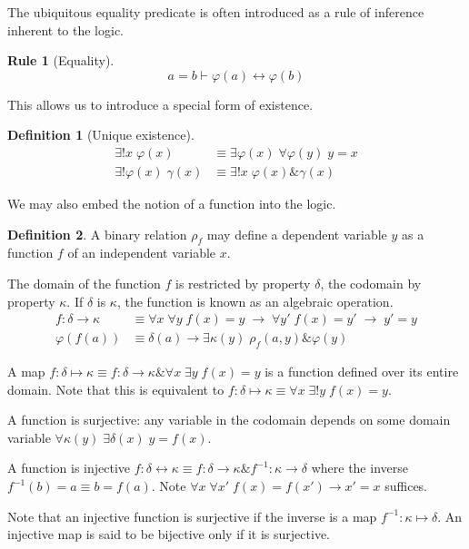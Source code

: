\documentclass{amsbook}
\newcommand{\infers}{\mathrel\vdash}
\newcommand{\univ}[1]{\mathord\forall#1\;}
\newcommand{\exis}[1]{\mathord\exists#1\;}
\newcommand{\then}{\mathrel\rightarrow}
\newcommand{\conj}{\mathrel\&}
\newcommand{\eqv}{\mathrel\leftrightarrow}
\theoremstyle{definition}
\newtheorem{frule}{Rule}[chapter]
\newtheorem{dfn}{Definition}[section]
\begin{document}
The ubiquitous equality predicate is often introduced as a rule of inference inherent to the logic.

\begin{frule}[Equality]
    $$a = b \infers \varphi(a) \eqv \varphi(b)$$
\end{frule}

This allows us to introduce a special form of existence.

\begin{dfn}[Unique existence]
    $$\begin{aligned}
            \exis{!x} \varphi(x)         & \equiv \exis{\varphi(x)} \univ{\varphi(y)} y = x \\
            \exis{!\varphi(x)} \gamma(x) & \equiv \exis{!x} \varphi(x) \conj \gamma(x)
        \end{aligned}$$
\end{dfn}

We may also embed the notion of a function into the logic.

\begin{dfn}
    A binary relation $\rho_f$ may define a dependent variable $y$ as a function $f$ of an independent variable $x$.

    The domain of the function $f$ is restricted by property $\delta$, the codomain by property $\kappa$.
    If $\delta$ is $\kappa$, the function is known as an algebraic operation.
    $$\begin{aligned}
            f: \delta \longrightarrow \kappa & \equiv \univ x \univ y f(x) = y\; \then \;\univ {y'} f(x) = y' \;\then\; y' = y \\
            \varphi(f(a))                    & \equiv \delta(a) \then \exis{\kappa(y)} \rho_f(a,y) \conj \varphi(y)
        \end{aligned}$$


    A map $f: \delta \longmapsto \kappa \equiv f: \delta \longrightarrow \kappa \conj \univ x \exis y f(x) = y$ is a function defined over its entire domain. Note that this is equivalent to $f: \delta \longmapsto \kappa \equiv \univ x \exis{!y} f(x) = y$.

    A function is surjective: any variable in the codomain depends on some domain variable $\univ{\kappa(y)}\exis{\delta(x)} y = f(x)$.

    A function is injective $f: \delta \longleftrightarrow \kappa \equiv f: \delta \longrightarrow \kappa \conj f^{-1}: \kappa \longrightarrow \delta$ where the inverse $f^{-1}(b) = a \equiv b = f(a)$. Note $\univ x \univ{x'} f(x) = f(x') \then x' = x$ suffices.

    Note that an injective function is surjective if the inverse is a map $f^{-1}: \kappa \longmapsto \delta$. An injective map is said to be bijective only if it is surjective.
\end{dfn}
\end{document}
